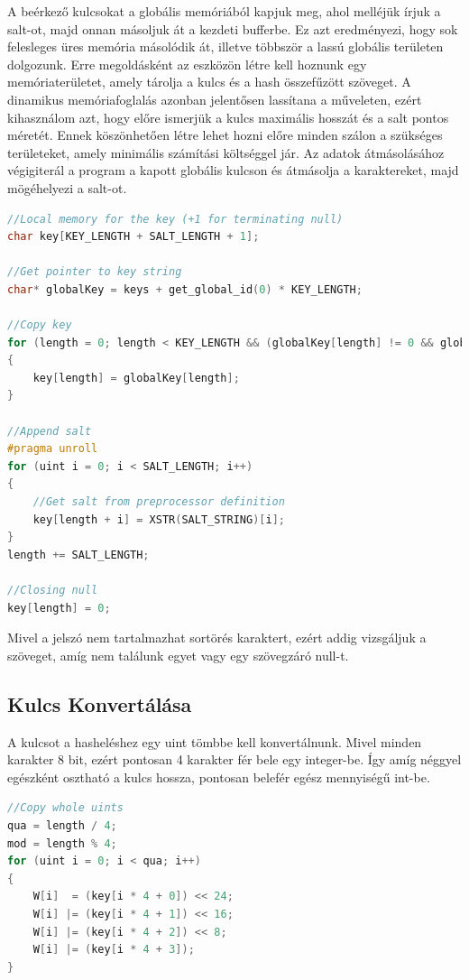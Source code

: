 A beérkező kulcsokat a globális memóriából kapjuk meg, ahol melléjük írjuk a salt-ot, majd onnan másoljuk át a kezdeti bufferbe. Ez azt eredményezi, hogy sok felesleges üres memória másolódik át, illetve többször a lassú globális területen dolgozunk. Erre megoldásként az eszközön létre kell hoznunk egy memóriaterületet, amely tárolja a kulcs és a hash összefűzött szöveget. A dinamikus memóriafoglalás azonban jelentősen lassítana a műveleten, ezért kihasználom azt, hogy előre ismerjük a kulcs maximális hosszát és a salt pontos méretét. Ennek köszönhetően létre lehet hozni előre minden szálon a szükséges területeket, amely minimális számítási költséggel jár. Az adatok átmásolásához végigiterál a program a kapott globális kulcson és átmásolja a karaktereket, majd mögéhelyezi a salt-ot.

\begin{lstlisting}[language={C++}]
//Local memory for the key (+1 for terminating null)
char key[KEY_LENGTH + SALT_LENGTH + 1];

//Get pointer to key string
char* globalKey = keys + get_global_id(0) * KEY_LENGTH;

//Copy key
for (length = 0; length < KEY_LENGTH && (globalKey[length] != 0 && globalKey[length] != '\n'); length++)
{
    key[length] = globalKey[length];
}

//Append salt
#pragma unroll
for (uint i = 0; i < SALT_LENGTH; i++)
{
    //Get salt from preprocessor definition
    key[length + i] = XSTR(SALT_STRING)[i];
}
length += SALT_LENGTH;

//Closing null
key[length] = 0;
\end{lstlisting}

Mivel a jelszó nem tartalmazhat sortörés karaktert, ezért addig vizsgáljuk a szöveget, amíg nem találunk egyet vagy egy szövegzáró null-t.



\subsection{Kulcs Konvertálása}


A kulcsot a hasheléshez egy uint tömbbe kell konvertálnunk. Mivel minden karakter 8 bit, ezért pontosan 4 karakter fér bele egy integer-be. Így amíg néggyel egészként osztható a kulcs hossza, pontosan belefér egész mennyiségű int-be.

\begin{lstlisting}[language={C++}]
//Copy whole uints
qua = length / 4;
mod = length % 4;
for (uint i = 0; i < qua; i++)
{
    W[i]  = (key[i * 4 + 0]) << 24;
    W[i] |= (key[i * 4 + 1]) << 16;
    W[i] |= (key[i * 4 + 2]) << 8;
    W[i] |= (key[i * 4 + 3]);
}
\end{lstlisting}

